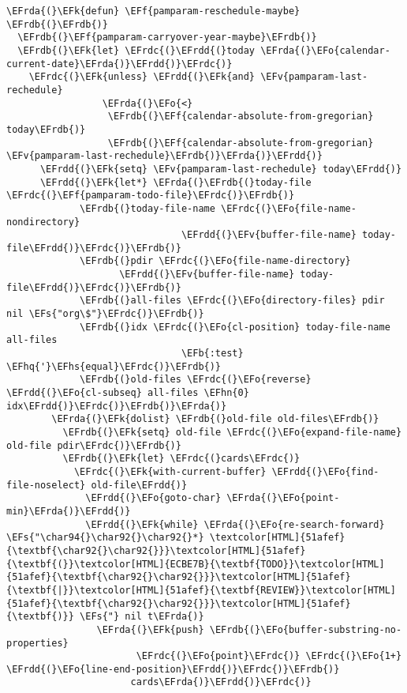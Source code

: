 \documentclass[a4wide,10pt]{article}
\newcommand{\EFs}[1]{\textcolor{EFs}{#1}} %
\newcommand{\EFk}[1]{\textcolor{EFk}{#1}} %
\newcommand{\EFb}[1]{\textcolor{EFb}{#1}} %
\newcommand{\EFf}[1]{\textcolor{EFf}{#1}} %
\newcommand{\EFv}[1]{\textcolor{EFv}{#1}} %
\newcommand{\EFo}[1]{\textcolor{EFo}{#1}} %
\newcommand{\EFhn}[1]{\textcolor{EFhn}{\textbf{#1}}} %
\newcommand{\EFhq}[1]{\textcolor{EFhq}{#1}} %
\newcommand{\EFhs}[1]{\textcolor{EFhs}{#1}} %
\newcommand{\EFrda}[1]{\textcolor{EFrda}{#1}} %
\newcommand{\EFrdb}[1]{\textcolor{EFrdb}{#1}} %
\newcommand{\EFrdc}[1]{\textcolor{EFrdc}{#1}} %
\newcommand{\EFrdd}[1]{\textcolor{EFrdd}{#1}} %
\begin{document}
\begin{Code}
\begin{Verbatim}
\EFrda{(}\EFk{defun} \EFf{pamparam-reschedule-maybe} \EFrdb{(}\EFrdb{)}
  \EFrdb{(}\EFf{pamparam-carryover-year-maybe}\EFrdb{)}
  \EFrdb{(}\EFk{let} \EFrdc{(}\EFrdd{(}today \EFrda{(}\EFo{calendar-current-date}\EFrda{)}\EFrdd{)}\EFrdc{)}
    \EFrdc{(}\EFk{unless} \EFrdd{(}\EFk{and} \EFv{pamparam-last-rechedule}
                 \EFrda{(}\EFo{<}
                  \EFrdb{(}\EFf{calendar-absolute-from-gregorian} today\EFrdb{)}
                  \EFrdb{(}\EFf{calendar-absolute-from-gregorian} \EFv{pamparam-last-rechedule}\EFrdb{)}\EFrda{)}\EFrdd{)}
      \EFrdd{(}\EFk{setq} \EFv{pamparam-last-rechedule} today\EFrdd{)}
      \EFrdd{(}\EFk{let*} \EFrda{(}\EFrdb{(}today-file \EFrdc{(}\EFf{pamparam-todo-file}\EFrdc{)}\EFrdb{)}
             \EFrdb{(}today-file-name \EFrdc{(}\EFo{file-name-nondirectory}
                               \EFrdd{(}\EFv{buffer-file-name} today-file\EFrdd{)}\EFrdc{)}\EFrdb{)}
             \EFrdb{(}pdir \EFrdc{(}\EFo{file-name-directory}
                    \EFrdd{(}\EFv{buffer-file-name} today-file\EFrdd{)}\EFrdc{)}\EFrdb{)}
             \EFrdb{(}all-files \EFrdc{(}\EFo{directory-files} pdir nil \EFs{"org\$"}\EFrdc{)}\EFrdb{)}
             \EFrdb{(}idx \EFrdc{(}\EFo{cl-position} today-file-name all-files
                               \EFb{:test} \EFhq{'}\EFhs{equal}\EFrdc{)}\EFrdb{)}
             \EFrdb{(}old-files \EFrdc{(}\EFo{reverse} \EFrdd{(}\EFo{cl-subseq} all-files \EFhn{0} idx\EFrdd{)}\EFrdc{)}\EFrdb{)}\EFrda{)}
        \EFrda{(}\EFk{dolist} \EFrdb{(}old-file old-files\EFrdb{)}
          \EFrdb{(}\EFk{setq} old-file \EFrdc{(}\EFo{expand-file-name} old-file pdir\EFrdc{)}\EFrdb{)}
          \EFrdb{(}\EFk{let} \EFrdc{(}cards\EFrdc{)}
            \EFrdc{(}\EFk{with-current-buffer} \EFrdd{(}\EFo{find-file-noselect} old-file\EFrdd{)}
              \EFrdd{(}\EFo{goto-char} \EFrda{(}\EFo{point-min}\EFrda{)}\EFrdd{)}
              \EFrdd{(}\EFk{while} \EFrda{(}\EFo{re-search-forward} \EFs{"\char94{}\char92{}\char92{}*} \textcolor[HTML]{51afef}{\textbf{\char92{}\char92{}}}\textcolor[HTML]{51afef}{\textbf{(}}\textcolor[HTML]{ECBE7B}{\textbf{TODO}}\textcolor[HTML]{51afef}{\textbf{\char92{}\char92{}}}\textcolor[HTML]{51afef}{\textbf{|}}\textcolor[HTML]{51afef}{\textbf{REVIEW}}\textcolor[HTML]{51afef}{\textbf{\char92{}\char92{}}}\textcolor[HTML]{51afef}{\textbf{)}} \EFs{"} nil t\EFrda{)}
                \EFrda{(}\EFk{push} \EFrdb{(}\EFo{buffer-substring-no-properties}
                       \EFrdc{(}\EFo{point}\EFrdc{)} \EFrdc{(}\EFo{1+} \EFrdd{(}\EFo{line-end-position}\EFrdd{)}\EFrdc{)}\EFrdb{)}
                      cards\EFrda{)}\EFrdd{)}\EFrdc{)}

\end{Verbatim}
\end{Code}
\end{document}

